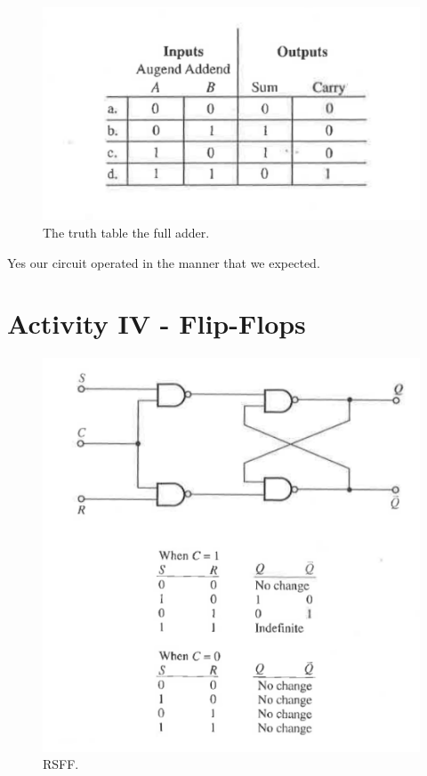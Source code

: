 \documentclass[11pt]{article}
\begin{document}
\begin{figure}[H]
 \begin{center}
  \includegraphics[width=\linewidth/2]{act3}
  \caption{The truth table the full adder.}
  \label{fig:act3}
 \end{center}
\end{figure}

Yes our circuit operated in the manner that we expected.


\section{Activity IV - Flip-Flops}

\begin{figure}[H]
 \begin{center}
  \includegraphics[width=\linewidth/2]{act4rsff}
  \caption{RSFF.}
  \label{fig:act4rsff}
 \end{center}
\end{figure}
\end{document}
